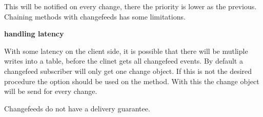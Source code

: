 This will be notified on every change, there the priority is lower as the previous.
Chaining methods with changefeeds has some limitations.


\textbf{handling latency}

With some latency on the client side, it is possible that there will be mutliple writes into a table, before the clinet gets all changefeed events.
By default a changefeed subscriber will only get one change object.
If this is not the desired procedure the option  should be used on the  method.
With this the change object will be send for every change.

Changefeeds do not have a delivery guarantee.

